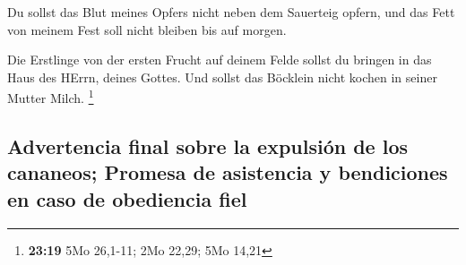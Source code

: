  Du sollst das Blut meines Opfers nicht neben dem
Sauerteig opfern, und das Fett von meinem Fest soll nicht bleiben bis
auf morgen.

 Die Erstlinge von der ersten Frucht auf deinem Felde
sollst du bringen in das Haus des HErrn, deines Gottes. Und sollst das
Böcklein nicht kochen in seiner Mutter Milch. \footnote{\textbf{23:19}
  5Mo 26,1-11; 2Mo 22,29; 5Mo 14,21}

\hypertarget{advertencia-final-sobre-la-expulsiuxf3n-de-los-cananeos-promesa-de-asistencia-y-bendiciones-en-caso-de-obediencia-fiel}{%
\subsection{Advertencia final sobre la expulsión de los cananeos;
Promesa de asistencia y bendiciones en caso de obediencia
fiel}\label{advertencia-final-sobre-la-expulsiuxf3n-de-los-cananeos-promesa-de-asistencia-y-bendiciones-en-caso-de-obediencia-fiel}}

